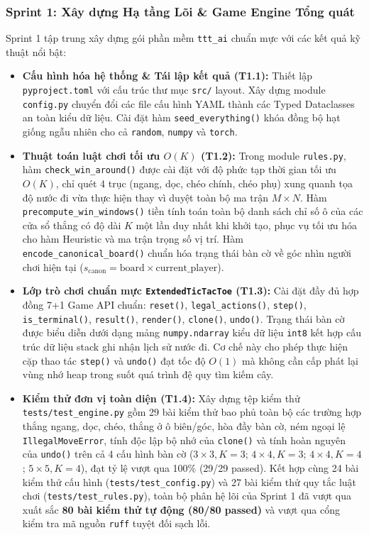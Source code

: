 \documentclass[a4paper,12pt]{report}
\begin{document}
\subsubsection{Sprint 1: Xây dựng Hạ tầng Lõi \& Game Engine Tổng quát}
Sprint 1 tập trung xây dựng gói phần mềm \texttt{ttt\_ai} chuẩn mực với các kết quả kỹ thuật nổi bật:
\begin{itemize}
    \item \textbf{Cấu hình hóa hệ thống \& Tái lập kết quả (T1.1):} Thiết lập \texttt{pyproject.toml} với cấu trúc thư mục \texttt{src/} layout. Xây dựng module \texttt{config.py} chuyển đổi các file cấu hình YAML thành các Typed Dataclasses an toàn kiểu dữ liệu. Cài đặt hàm \texttt{seed\_\allowbreak everything()} khóa đồng bộ hạt giống ngẫu nhiên cho cả \texttt{random}, \texttt{numpy} và \texttt{torch}.
    \item \textbf{Thuật toán luật chơi tối ưu $O(K)$ (T1.2):} Trong module \texttt{rules.py}, hàm \texttt{check\_\allowbreak win\_\allowbreak around()} được cài đặt với độ phức tạp thời gian tối ưu $O(K)$, chỉ quét 4 trục (ngang, dọc, chéo chính, chéo phụ) xung quanh tọa độ nước đi vừa thực hiện thay vì duyệt toàn bộ ma trận $M \times N$. Hàm \texttt{precompute\_\allowbreak win\_\allowbreak windows()} tiền tính toán toàn bộ danh sách chỉ số ô của các cửa sổ thắng có độ dài $K$ một lần duy nhất khi khởi tạo, phục vụ tối ưu hóa cho hàm Heuristic và ma trận trọng số vị trí. Hàm \texttt{encode\_\allowbreak canonical\_\allowbreak board()} chuẩn hóa trạng thái bàn cờ về góc nhìn người chơi hiện tại ($s_{\text{canon}} = \text{board} \times \text{current\_player}$).
    \item \textbf{Lớp trò chơi chuẩn mực \texttt{ExtendedTicTacToe} (T1.3):} Cài đặt đầy đủ hợp đồng 7+1 Game API chuẩn: \texttt{reset()}, \texttt{legal\_actions()}, \texttt{step()}, \texttt{is\_terminal()}, \texttt{result()}, \texttt{render()}, \texttt{clone()}, \texttt{undo()}. Trạng thái bàn cờ được biểu diễn dưới dạng mảng \texttt{numpy.ndarray} kiểu dữ liệu \texttt{int8} kết hợp cấu trúc dữ liệu stack ghi nhận lịch sử nước đi. Cơ chế này cho phép thực hiện cặp thao tác \texttt{step()} và \texttt{undo()} đạt tốc độ $O(1)$ mà không cần cấp phát lại vùng nhớ heap trong suốt quá trình đệ quy tìm kiếm cây.
    \item \textbf{Kiểm thử đơn vị toàn diện (T1.4):} Xây dựng tệp kiểm thử \texttt{tests/\allowbreak test\_engine.py} gồm 29 bài kiểm thử bao phủ toàn bộ các trường hợp thắng ngang, dọc, chéo, thắng ở ô biên/góc, hòa đầy bàn cờ, ném ngoại lệ \texttt{IllegalMoveError}, tính độc lập bộ nhớ của \texttt{clone()} và tính hoàn nguyên của \texttt{undo()} trên cả 4 cấu hình bàn cờ ($3 \times 3, K=3$; $4 \times 4, K=3$; $4 \times 4, K=4$; $5 \times 5, K=4$), đạt tỷ lệ vượt qua 100\% (29/29 passed). Kết hợp cùng 24 bài kiểm thử cấu hình (\texttt{tests/\allowbreak test\_config.py}) và 27 bài kiểm thử quy tắc luật chơi (\texttt{tests/\allowbreak test\_rules.py}), toàn bộ phân hệ lõi của Sprint 1 đã vượt qua xuất sắc \textbf{80 bài kiểm thử tự động (80/80 passed)} và vượt qua cổng kiểm tra mã nguồn \texttt{ruff} tuyệt đối sạch lỗi.
\end{itemize}
\end{document}
